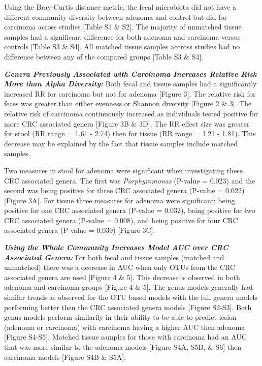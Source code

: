 \documentclass[12pt,]{article}
\begin{document}
Using the Bray-Curtis distance metric, the fecal microbiota did not have
a different community diversity between adenoma and control but did for
carcinoma across studies {[}Table S1 \& S2{]}. The majority of unmatched
tissue samples had a significant difference for both adenoma and
carcinoma versus controls {[}Table S3 \& S4{]}. All matched tissue
samples accross studies had no difference between any of the compared
groups {[}Table S3 \& S4{]}.

\textbf{\emph{Genera Previously Associated with Carcinoma Increases
Relative Risk More than Alpha Diversity:}} Both fecal and tissue samples
had a significantly increased RR for carcinoma but not for adenoma
{[}Figure 3{]}. The relative risk for feces was greater than either
evenness or Shannon diversity {[}Figure 2 \& 3{]}. The relative risk of
carcinoma continuously increased as individuals tested positive for more
CRC associated genera {[}Figure 3B \& 3D{]}. The RR effect size was
greater for stool (RR range = 1.61 - 2.74) then for tissue (RR range =
1.21 - 1.81). This decrease may be explained by the fact that tissue
samples include matched samples.

Two measures in stool for adenoma were significant when investigating
these CRC associated genera. The first was \emph{Porphyromonas} (P-value
= 0.023) and the second was being positive for three CRC associated
genera (P-value = 0.022) {[}Figure 3A{]}. For tissue three measures for
adenoma were significant; being positive for one CRC associated genera
(P-value = 0.032), being positive for two CRC associated genera (P-value
= 0.008), and being positive for four CRC associated genera (P-value =
0.039) {[}Figure 3C{]}.

\textbf{\emph{Using the Whole Community Increases Model AUC over CRC
Associated Genera:}} For both fecal and tissue samples (matched and
unmatched) there was a decrease in AUC when only OTUs from the CRC
associated genera are used {[}Figure 4 \& 5{]}. This decrease is
observed in both adenoma and carcinoma groups {[}Figure 4 \& 5{]}. The
genus models generally had similar trends as observed for the OTU based
models with the full genera models performing better then the CRC
associated genera models {[}Figure S2-S3{]}. Both genus models perform
similarily in their ability to be able to predict lesion (adenoma or
carcinoma) with carcinoma having a higher AUC then adenoma {[}Figure
S4-S5{]}. Matched tissue samples for those with carcinoma had an AUC
that was more similar to the adenoma models {[}Figure S4A, S5B, \& S6{]}
then carcinoma models {[}Figure S4B \& S5A{]}.
\end{document}
